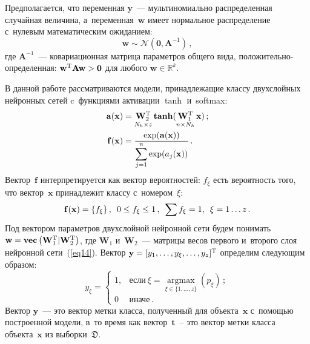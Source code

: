 \begin{multicols}{2}
\smallskip

Предполагается, что переменная $\mathbf{y}$~--- мультиномиально
распределенная случайная величина, а~переменная~$\mathbf{w}$ имеет нормальное
распределение с~нулевым математическим ожиданием:
\begin{equation}
\label{eq:1}
\mathbf{w} \sim \mathcal{N}\left(\boldsymbol{0}, \mathbf{A}^{-1}\right)\,,
\end{equation}
где $\mathbf{A}^{-1}$~--- ковариационная матрица параметров
общего вида, по\-ло\-жи\-тель\-но-опре\-де\-лен\-ная:
$\mathbf{w}^{\mathrm{T}}\mathbf{A}\mathbf{w} \hm> \boldsymbol{0}$ для любого
$\mathbf{w} \in \mathbb{R}^k$.

В данной работе  рассматриваются модели, принадлежащие классу
двухслойных нейронных сетей c~функциями активации $\tanh$  и~softmax:
\begin{align}
\label{eq14}
\mathbf{a(\mathbf{x})}& =
\mathop{\mathbf{W}_2^{\mathrm{T}}}\limits_{N_h \times z}\mathbf{tanh}(\mathop{\mathbf{W}_1^{\mathrm{T}}}\limits_{n \times N_h}\mathbf{x})\,;
\\
\mathbf{f(\mathbf{x})} &= \displaystyle\frac{\displaystyle \exp(\mathbf{a(\mathbf{x})})\mathstrut}{\displaystyle \sum_{j=1}^n \exp(a_j(\mathbf{x}))\mathstrut}\,.\notag
\end{align}
Вектор~$\mathbf{f}$ интерпретируется как вектор
вероятностей: $f_{\xi}$ есть вероятность того, что вектор~$\mathbf{x}$
принадлежит классу с~номером~${\xi}$:
\begin{equation*}
\mathbf{f(\mathbf{x})} = \{f_\xi\}\,,\enskip
0 \leq f_{\xi} \leq 1\,,\enskip \sum f_{\xi} = 1, \enskip {\xi} = 1\dots z\,.
\end{equation*}
Под вектором параметров двухслойной нейронной сети будем понимать
$\mathbf{w}\hm=\mathbf{vec}\left(\mathbf{W}_1^{\mathrm{T}}|\mathbf{W}_2^{\mathrm{T}}\right)$,
где $\mathbf{W}_1$ и~$\mathbf{W}_2$~--- матрицы весов первого и~второго слоя
нейронной сети~(\ref{eq14}). Вектор $\mathbf{y}\hm=[y_1,\dots,y_{\xi},\dots,y_z]^{\mathrm{T}}$
определим следующим образом:
\begin{equation*}
y_{\xi} = \begin{cases}
1, & \mbox{если}~{\xi} = \mathop{\arg\max}\limits_{\xi \in \{1,\dots,z\}} (p_{\xi})\,;  \\
0 & \mbox{иначе}\,.
\end{cases}
\end{equation*}
Вектор $\mathbf{y}$~--- это вектор метки класса, полученный для
объекта~$\mathbf{x}$ с~помощью построенной модели, в~то время как
вектор~$\mathbf{t}$~-- это вектор метки класса объекта~$\mathbf{x}$ из
выборки~$\mathfrak{D}$.


\end{multicols}
